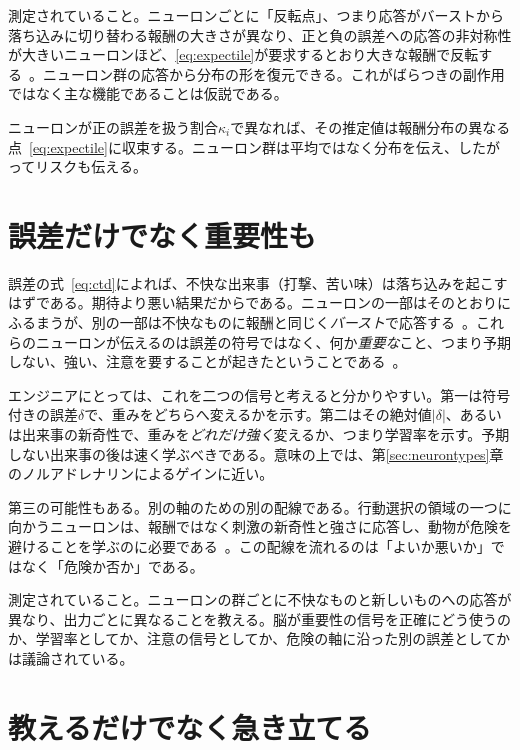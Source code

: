 測定されていること。ニューロンごとに「反転点」、つまり応答がバーストから落ち込みに切り替わる報酬の大きさが異なり、正と負の誤差への応答の非対称性が大きいニューロンほど、\eqref{eq:expectile}が要求するとおり大きな報酬で反転する~\cite{Dabney2020}。ニューロン群の応答から分布の形を復元できる。これがばらつきの副作用ではなく主な機能であることは仮説である。

\begin{keyblock}
\begin{proposition}[非対称性から分布へ]
\label{prop:expectile}
ニューロンが正の誤差を扱う割合$\kappa_i$で異なれば、その推定値は報酬分布の異なる点~\eqref{eq:expectile}に収束する。ニューロン群は平均ではなく分布を伝え、したがってリスクも伝える。
\end{proposition}
\end{keyblock}

\section{誤差だけでなく重要性も}

誤差の式~\eqref{eq:ctd}によれば、不快な出来事（打撃、苦い味）は落ち込みを起こすはずである。期待より悪い結果だからである。ニューロンの一部はそのとおりにふるまうが、別の一部は不快なものに報酬と同じく\emph{バースト}で応答する~\cite{Matsumoto2009}。これらのニューロンが伝えるのは誤差の符号ではなく、何か\emph{重要な}こと、つまり予期しない、強い、注意を要することが起きたということである~\cite{BrombergMartin2010}。

エンジニアにとっては、これを二つの信号と考えると分かりやすい。第一は符号付きの誤差$\delta$で、重みをどちらへ変えるかを示す。第二はその絶対値$|\delta|$、あるいは出来事の新奇性で、重みを\emph{どれだけ強く}変えるか、つまり学習率を示す。予期しない出来事の後は速く学ぶべきである。意味の上では、第\ref{sec:neurontypes}章のノルアドレナリンによるゲインに近い。

第三の可能性もある。別の軸のための別の配線である。行動選択の領域の一つに向かうニューロンは、報酬ではなく刺激の新奇性と強さに応答し、動物が危険を避けることを学ぶのに必要である~\cite{Menegas2018}。この配線を流れるのは「よいか悪いか」ではなく「危険か否か」である。

測定されていること。ニューロンの群ごとに不快なものと新しいものへの応答が異なり、出力ごとに異なることを教える。脳が重要性の信号を正確にどう使うのか、学習率としてか、注意の信号としてか、危険の軸に沿った別の誤差としてかは議論されている。

\section{教えるだけでなく急き立てる}

